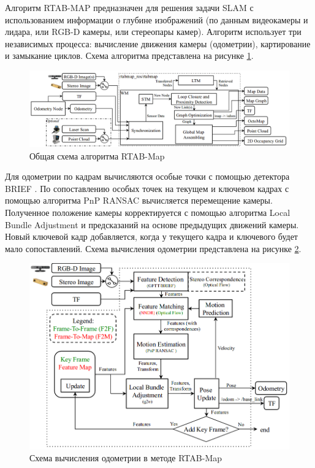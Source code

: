 \documentclass{mipt-thesis-ms}
\begin{document}
	Алгоритм RTAB-MAP \cite{labbe2011memory} предназначен для решения задачи SLAM с использованием информации о глубине изображений (по данным видеокамеры и лидара, или RGB-D камеры, или стереопары камер). Алгоритм использует три независимых процесса: вычисление движения камеры (одометрии), картирование и замыкание циклов. Схема алгоритма представлена на рисунке \ref{figurertabmap}.
	
	\begin{figure}
		\centering
		\includegraphics[scale=0.4]{img/rtabmap_scheme.png}
		\caption{Общая схема алгоритма RTAB-Map}
		\label{figurertabmap}
	\end{figure}
	
	Для одометрии по кадрам вычисляются особые точки с помощью детектора BRIEF \cite{calonder2010brief}. По сопоставлению особых точек на текущем и ключевом кадрах с помощью алгоритма PnP RANSAC \cite{brachmann2017dsac} вычисляется перемещение камеры. Полученное положение камеры корректируется с помощью алгоритма Local Bundle Adjustment \cite{zhang2006incremental} и предсказаний на основе предыдущих движений камеры. Новый ключевой кадр добавляется, когда у текущего кадра и ключевого будет мало сопоставлений. Схема вычисления одометрии представлена на рисунке \ref{figurergbdodometry}.
	
	\begin{figure}
		\centering
		\includegraphics[scale=0.4]{img/rgbd_odometry.png}
		\caption{Схема вычисления одометрии в методе RTAB-Map}
		\label{figurergbdodometry}
	\end{figure}
	
\end{document}
